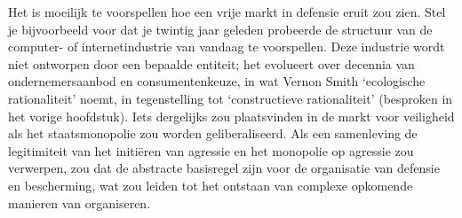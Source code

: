 \documentclass[
  a5paper,
  smalldemyvopaper,11pt,twoside,onecolumn,openright,extrafontsizes,
hidelinks]{memoir}
\begin{document}
Het is moeilijk te voorspellen hoe een vrije markt in defensie eruit zou
zien. Stel je bijvoorbeeld voor dat je twintig jaar geleden probeerde de
structuur van de computer- of internetindustrie van vandaag te
voorspellen. Deze industrie wordt niet ontworpen door een bepaalde
entiteit; het evolueert over decennia van ondernemersaanbod en
consumentenkeuze, in wat Vernon Smith `ecologische rationaliteit' noemt,
in tegenstelling tot `constructieve rationaliteit' (besproken in het
vorige hoofdstuk). Iets dergelijks zou plaatsvinden in de markt voor
veiligheid als het staatsmonopolie zou worden geliberaliseerd. Als een
samenleving de legitimiteit van het initiëren van agressie en het
monopolie op agressie zou verwerpen, zou dat de abstracte basisregel
zijn voor de organisatie van defensie en bescherming, wat zou leiden tot
het ontstaan van complexe opkomende manieren van organiseren.
\end{document}
